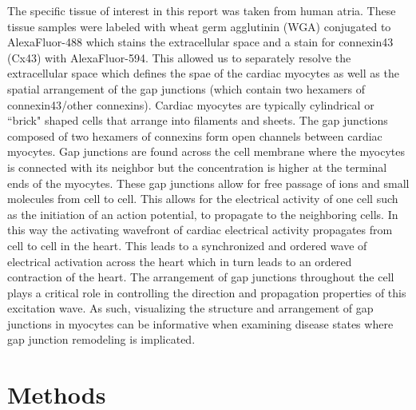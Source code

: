 \documentclass[12pt]{article}
\begin{document}
The specific tissue of interest in this report was taken from human atria. These tissue samples were labeled with wheat  germ  agglutinin (WGA)  conjugated  to  AlexaFluor-488 which stains the extracellular space and a stain for connexin43 (Cx43) with AlexaFluor-594. This allowed us to separately resolve the extracellular space which defines the spae of the cardiac myocytes as well as the spatial arrangement of the gap junctions (which contain two hexamers of connexin43/other connexins). Cardiac myocytes are typically cylindrical or ``brick" shaped cells that arrange into filaments and sheets.\cite{Woodcock2005} The gap junctions composed of two hexamers of connexins form open channels between cardiac myocytes. Gap junctions are found across the cell membrane where the myocytes is connected with its neighbor but the concentration is higher at the terminal ends of the myocytes.\cite{Mese2007} These gap junctions allow for free passage of ions and small molecules from cell to cell. This allows for the electrical activity of one cell such as the initiation of an action potential, to propagate to the neighboring cells. In this way the activating wavefront of cardiac electrical activity propagates from cell to cell in the heart. This leads to a synchronized and ordered wave of electrical activation across the heart which in turn leads to an ordered contraction of the heart.\cite{Mese2007} The arrangement of gap junctions throughout the cell plays a critical role in controlling the direction and propagation properties of this excitation wave. As such, visualizing the structure and arrangement of gap junctions in myocytes can be informative when examining disease states where gap junction remodeling is implicated.

\section{Methods}
\end{document}
